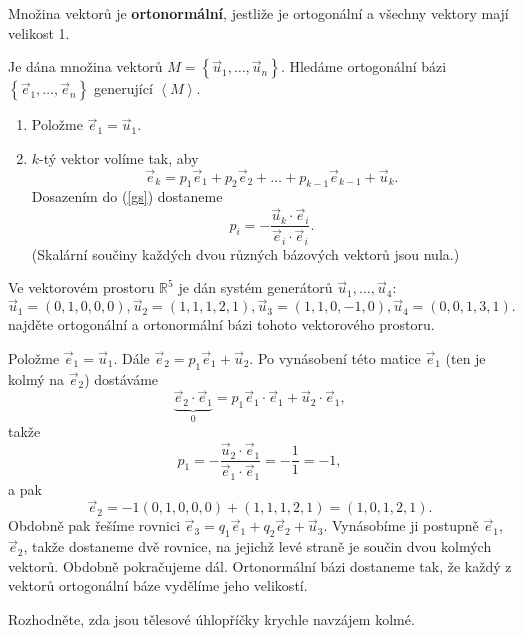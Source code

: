 \begin{definition}
    Množina vektorů je \textbf{ortonormální}, jestliže je ortogonální a všechny vektory mají
    velikost 1.
\end{definition}

\begin{veta}
    Je dána množina vektorů $M=\left \{ \vec u_1,\dots, \vec u_n \right \}$.
    Hledáme ortogonální bázi $\left \{ \vec e_1, \dots, \vec e_n \right \}$
    generující $\left < M \right >.$
    \begin{enumerate}[1.]
    \item Položme $\vec e_1 = \vec u_1.$
   	\item $k$-tý vektor volíme tak, aby
    \begin{equation}\label{gs}
    \vec e_k = p_1\vec e_1 + p_2\vec e_2 + \dots +p_{k-1} \vec e_{k-1} + \vec u_k.
    \end{equation}
    Dosazením do (\ref{gs}) dostaneme
    $$p_i = -\frac{\vec u_k\cdot \vec e_i}{\vec e_i\cdot \vec e_i}.$$
    (Skalární součiny každých dvou různých bázových vektorů jsou nula.)
    \end{enumerate}
\end{veta}

\begin{priklad}
Ve vektorovém prostoru $\mathbb R^5$ je dán systém generátorů $\vec u_1,\dots,\vec u_4$:
$$
    \vec u_1 = (0,1,0,0,0), \vec u_2 = (1,1,1,2,1), \vec u_3 = (1,1,0,-1,0), \vec u_4 = (0,0,1,3,1).
$$
najděte ortogonální a ortonormální bázi tohoto vektorového prostoru.
\end{priklad}

\begin{reseni}
Položme $\vec e_1=\vec u_1.$ Dále $\vec e_2 = p_1\vec e_1 + \vec u_2$. Po vynásobení
této matice $\vec e_1$ (ten je kolmý na $\vec e_2$) dostáváme
$$\underbrace{\vec e_2\cdot \vec e_1}_{0}=p_1\vec e_1\cdot\vec e_1+\vec u_2\cdot\vec e_1,$$
takže
$$p_1=-\frac{\vec u_2\cdot\vec e_1}{\vec e_1\cdot\vec e_1} = -\frac{1}{1}=-1,$$
a pak
$$\vec e_2 = -1(0,1,0,0,0)+(1,1,1,2,1)=(1,0,1,2,1).$$
Obdobně pak řešíme rovnici $\vec e_3=q_1\vec e_1 + q_2\vec e_2 + \vec u_3$. Vynásobíme
ji postupně $\vec e_1$, $\vec e_2$, takže dostaneme dvě rovnice, na jejichž levé straně
je součin dvou kolmých vektorů. Obdobně pokračujeme dál. Ortonormální bázi
dostaneme tak, že každý z vektorů ortogonální báze vydělíme jeho velikostí.
\end{reseni}

\begin{priklad}
Rozhodněte, zda jsou tělesové úhlopříčky krychle navzájem kolmé.
\end{priklad}

